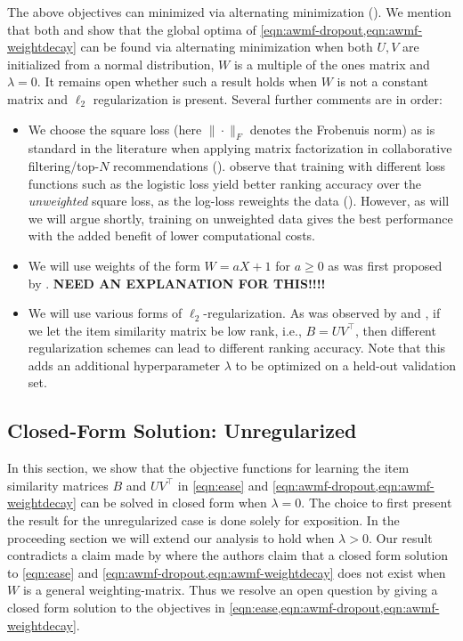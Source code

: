 The above objectives can minimized via alternating minimization (\citet{cichocki2007regularized}). We mention that both \citet{ye2021global} and \citet{lee2023randomly} show that the global optima of \cref{eqn:awmf-dropout,eqn:awmf-weightdecay} can be found via alternating minimization when both $U,V$ are initialized from a normal distribution, $W$ is a multiple of the ones matrix and $\lambda = 0$. It remains open whether such a result holds when $W$ is not a constant matrix and $\ell_2$ regularization is present. Several further comments are in order:
\begin{itemize}
    \item We choose the square loss (here $\| \cdot \|_F$ denotes the Frobenuis norm) as is standard in the literature when applying matrix factorization in collaborative filtering/top-$N$ recommendations (\citet{hu2008collaborative,ning2011slim,steck2019embarrassingly,NEURIPS2020_e33d974a}). \citet{liang2018variational,depauw24} observe that training with different loss functions such as the logistic loss yield better ranking accuracy over the \textit{unweighted} square loss, as the log-loss reweights the data (\citet{ayoubswitching}). However, as will we will argue shortly, training on unweighted data gives the best performance with the added benefit of lower computational costs. 
    \item We will use weights of the form $W = aX + 1$ for $a \geq 0$ as was first proposed by \citet{hu2008collaborative}. \textbf{NEED AN EXPLANATION FOR THIS!!!!}
    \item We will use various forms of $\ell_2$-regularization. As was observed by \citet{NEURIPS2020_e33d974a,steck2021regularization} and \citet{jin2021towards}, if we let the item similarity matrix be low rank, i.e., $B=UV^\top$, then different regularization schemes can lead to different ranking accuracy. Note that this adds an additional hyperparameter $\lambda$ to be optimized on a held-out validation set. 
\end{itemize}

\subsection{Closed-Form Solution: Unregularized}
In this section, we show that the objective functions for learning the item similarity matrices $B$ and $UV^\top$ in \cref{eqn:ease} and \cref{eqn:awmf-dropout,eqn:awmf-weightdecay} can be solved in closed form when $\lambda = 0$. The choice to first present the result for the unregularized case is done solely for exposition. In the proceeding section we will extend our analysis to hold when $\lambda > 0$. Our result contradicts a claim made by \citet{steck2019collaborative,jin2021towards} where the authors claim that a closed form solution to \cref{eqn:ease} and \cref{eqn:awmf-dropout,eqn:awmf-weightdecay} does not exist when $W$ is a general weighting-matrix. Thus we resolve an open question by giving a closed form solution to the objectives in \cref{eqn:ease,eqn:awmf-dropout,eqn:awmf-weightdecay}. 

